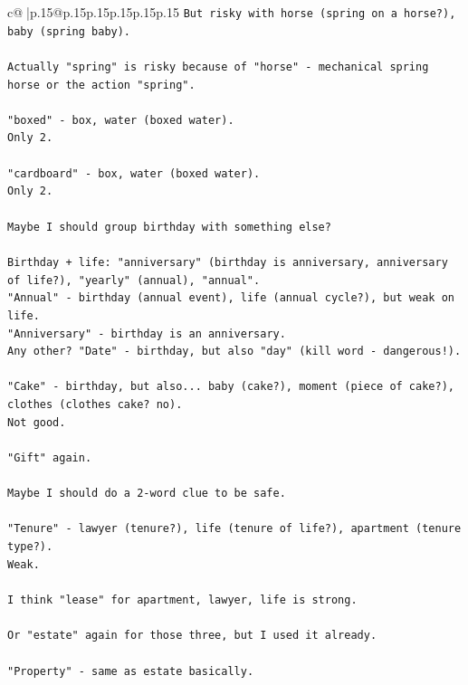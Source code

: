 \documentclass{article}
\begin{document}
{\begin{supertabular}{c@{$\;$}|p{.15\linewidth}@{}p{.15\linewidth}p{.15\linewidth}p{.15\linewidth}p{.15\linewidth}p{.15\linewidth}}
{{{\texttt{But risky with horse (spring on a horse?), baby (spring baby).} \\
\\ 
\texttt{Actually "spring" is risky because of "horse" {-} mechanical spring horse or the action "spring".} \\
\\ 
\texttt{"boxed" {-} box, water (boxed water).} \\
\texttt{Only 2.} \\
\\ 
\texttt{"cardboard" {-} box, water (boxed water).} \\
\texttt{Only 2.} \\
\\ 
\texttt{Maybe I should group birthday with something else?} \\
\\ 
\texttt{Birthday + life: "anniversary" (birthday is anniversary, anniversary of life?), "yearly" (annual), "annual".} \\
\texttt{"Annual" {-} birthday (annual event), life (annual cycle?), but weak on life.} \\
\texttt{"Anniversary" {-} birthday is an anniversary.} \\
\texttt{Any other? "Date" {-} birthday, but also "day" (kill word {-} dangerous!).} \\
\\ 
\texttt{"Cake" {-} birthday, but also... baby (cake?), moment (piece of cake?), clothes (clothes cake? no).} \\
\texttt{Not good.} \\
\\ 
\texttt{"Gift" again.} \\
\\ 
\texttt{Maybe I should do a 2{-}word clue to be safe.} \\
\\ 
\texttt{"Tenure" {-} lawyer (tenure?), life (tenure of life?), apartment (tenure type?).} \\
\texttt{Weak.} \\
\\ 
\texttt{I think "lease" for apartment, lawyer, life is strong.} \\
\\ 
\texttt{Or "estate" again for those three, but I used it already.} \\
\\ 
\texttt{"Property" {-} same as estate basically.} \\
\\ 
}}}
\end{supertabular}}
\end{document}
